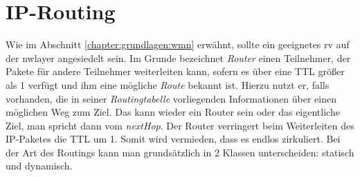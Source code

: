 %
\section{IP-Routing}
\label{chapter:grundlagen:routing}

Wie im Abschnitt \ref{chapter:grundlagen:wmn} erwähnt, sollte ein geeignetes \acrlong{rv} auf der \gls{nwlayer} angesiedelt sein. Im Grunde bezeichnet \textit{Router}  einen Teilnehmer, der Pakete für andere Teilnehmer weiterleiten kann, sofern es über eine TTL größer als 1 verfügt und ihm eine mögliche \textit{Route} bekannt ist. Hierzu nutzt er, falls vorhanden, die in seiner \textit{Routingtabelle} vorliegenden Informationen über einen möglichen Weg zum Ziel. Das kann wieder ein Router sein oder das eigentliche Ziel, man spricht dann vom \textit{nextHop}. Der Router verringert beim Weiterleiten des IP-Paketes die TTL um 1. Somit wird vermieden, dass es endlos zirkuliert. Bei der Art des Routings kann man grundsätzlich in 2 Klassen unterscheiden: statisch und dynamisch.


